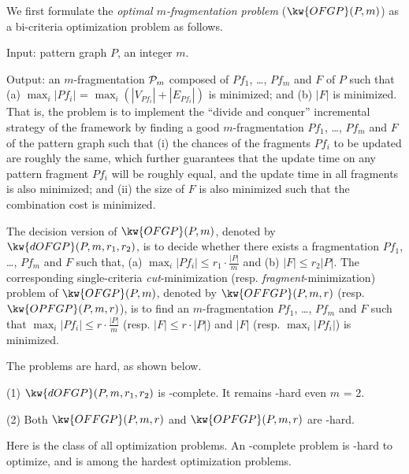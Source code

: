 We first formulate the {\em optimal $m$-fragmentation problem} ($\kw{OFGP}(P,m)$) as a bi-criteria optimization problem as follows.
\bi
\item Input: pattern graph $P$, an integer $m$.
\item Output: an $m$-fragmentation ${\cal P}_{m}$ composed of ${Pf}_1$, \ldots, ${Pf}_m$ and $F$ of $P$ such that (a) $\max_i |{Pf}_i|$ = $\max_i (|V_{{Pf}_i}| + |E_{{Pf}_i}|)$ is minimized; and (b) $|F|$ is minimized.
\ei
That is, the problem is to implement the ``divide and conquer'' incremental strategy of the framework by finding a good $m$-fragmentation ${Pf}_1$, \ldots, ${Pf}_m$ and $F$ of the pattern graph such that
(i) the chances of the fragments ${Pf}_i$ to be updated are roughly the same, which further guarantees that the update time on any pattern fragment ${Pf}_i$ will be roughly equal, and the update time in all fragments is also minimized; and
(ii) the size of $F$ is also minimized such that the combination cost is minimized.

The decision version of $\kw{OFGP}(P, m)$, denoted by $\kw{dOFGP}(P, m, r_1, r_2)$, is to decide whether there exists a fragmentation ${Pf}_1$, \ldots, ${Pf}_m$ and $F$ such that, (a) $\max_i |{Pf}_i| \leq r_1\cdot\frac{|P|}{m}$ and (b) $|F|\leq r_2|P|$.
The corresponding single-criteria {\em cut}-minimization (resp. {\em fragment}-minimization) problem of $\kw{OFGP}(P, m)$, denoted by $\kw{OFFGP}(P, m, r)$ (resp. $\kw{OPFGP}(P, m, r)$), is to find an $m$-fragmentation ${Pf}_1$, \ldots, ${Pf}_m$ and $F$ such that $\max_i |{Pf}_i| \leq r\cdot\frac{|P|}{m}$ (resp. $|F|\leq r\cdot |P|$) and $|F|$ (resp. $\max_i |{Pf}_i|$) is minimized.

The problems are hard, as shown below.

\begin{prop}
\label{thm-fragmentation-hardness}
(1) $\kw{dOFGP}(P, m, r_1, r_2)$ is \NP-complete. It remains \NP-hard even $m$ = 2.

\sstab (2) Both $\kw{OFFGP}(P, m, r)$ and $\kw{OPFGP}(P, m, r)$ are \NPO-hard.
\end{prop}

Here \NPO is the class of all \NP optimization problems. An
\NPO-complete problem is \NP-hard to optimize, and is among the
hardest \NP optimization problems.

